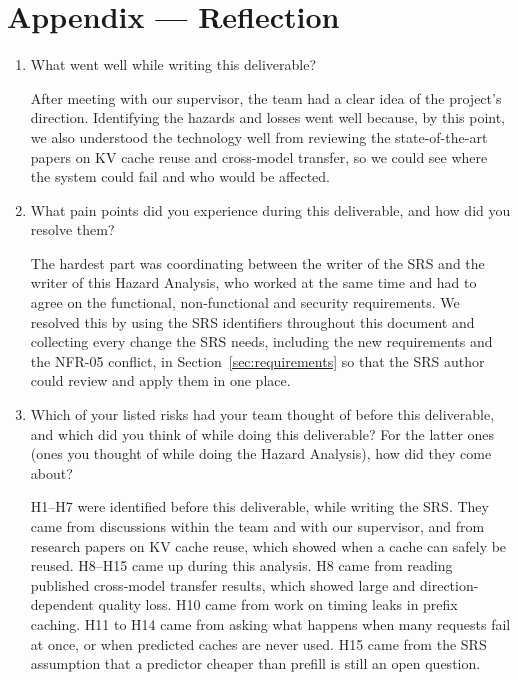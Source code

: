 \documentclass{article}
\begin{document}
\section{Appendix --- Reflection}



\begin{enumerate}
    \item What went well while writing this deliverable?

    After meeting with our supervisor, the team had a clear idea of the
    project's direction. Identifying the hazards and losses went well
    because, by this point, we also understood the technology well from
    reviewing the state-of-the-art papers on KV cache reuse and cross-model
    transfer, so we could see where the system could fail and who would be
    affected.

    \item What pain points did you experience during this deliverable, and how
    did you resolve them?

    The hardest part was coordinating between the writer of the SRS and the
    writer of this Hazard Analysis, who worked at the same time and had to
    agree on the functional, non-functional and security requirements. We
    resolved this by using the SRS identifiers throughout this document and
    collecting every change the SRS needs, including the new requirements
    and the NFR-05 conflict, in Section~\ref{sec:requirements} so that the SRS
    author could review and apply them in one place.

    \item Which of your listed risks had your team thought of before this
    deliverable, and which did you think of while doing this deliverable? For
    the latter ones (ones you thought of while doing the Hazard Analysis), how
    did they come about?

    H1--H7 were identified before this
    deliverable, while writing the SRS. They came from discussions within
    the team and with our supervisor, and from research papers on KV cache
    reuse, which showed when a cache can safely be reused. H8--H15 came up
    during this analysis. H8 came from reading published cross-model
    transfer results, which showed large and direction-dependent quality
    loss. H10 came from work on timing leaks in prefix caching. H11 to H14
    came from asking what happens when many requests fail at once, or when
    predicted caches are never used. H15 came from the SRS assumption that a
    predictor cheaper than prefill is still an open question.


\end{enumerate}
\end{document}

